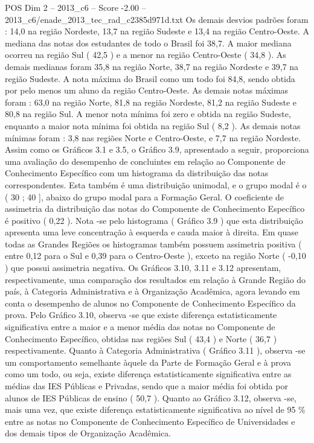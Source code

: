 \begin{textsample}{POS Dim 2 – 2013\_c6 – Score -2.00 – 2013\_c6/enade\_2013\_tec\_rad\_c2385d971d.txt}
Os demais desvios padrões foram : 14,0 na região Nordeste, 13,7 na região Sudeste e 13,4 na região Centro-Oeste.
A mediana das notas dos estudantes de todo o Brasil foi 38,7.
A maior mediana ocorreu na região Sul ( 42,5 ) e a menor na região Centro-Oeste ( 34,8 ).
As demais medianas foram 35,8 na região Norte, 38,7 na região Nordeste e 39,7 na região Sudeste.
A nota máxima do Brasil como um todo foi 84,8, sendo obtida por pelo menos um aluno da região Centro-Oeste.
As demais notas máximas foram : 63,0 na região Norte, 81,8 na região Nordeste, 81,2 na região Sudeste e 80,8 na região Sul.
A menor nota mínima foi zero e obtida na região Sudeste, enquanto a maior nota mínima foi obtida na região Sul ( 8,2 ).
As demais notas mínimas foram : 3,8 nas regiões Norte e Centro-Oeste, e 7,7 na região Nordeste.
Assim como os Gráficos 3.1 e 3.5, o Gráfico 3.9, apresentado a seguir, proporciona uma avaliação do desempenho de concluintes em relação ao Componente de Conhecimento Específico com um histograma da distribuição das notas correspondentes.
Esta também é uma distribuição unimodal, e o grupo modal é o ( 30 ; 40 ], abaixo do grupo modal para a Formação Geral.
O coeficiente de assimetria da distribuição das notas do Componente de Conhecimento Específico é positivo ( 0,22 ).
Nota -se pelo histograma ( Gráfico 3.9 ) que esta distribuição apresenta uma leve concentração à esquerda e cauda maior à direita.
Em quase todas as Grandes Regiões os histogramas também possuem assimetria positiva ( entre 0,12 para o Sul e 0,39 para o Centro-Oeste ), exceto na região Norte ( -0,10 ) que possui assimetria negativa.
Os Gráficos 3.10, 3.11 e 3.12 apresentam, respectivamente, uma comparação dos resultados em relação à Grande Região do país, à Categoria Administrativa e à Organização Acadêmica, agora levando em conta o desempenho de alunos no Componente de Conhecimento Específico da prova.
Pelo Gráfico 3.10, observa -se que existe diferença estatisticamente significativa entre a maior e a menor média das notas no Componente de Conhecimento Específico, obtidas nas regiões Sul ( 43,4 ) e Norte ( 36,7 ) respectivamente.
Quanto à Categoria Administrativa ( Gráfico 3.11 ), observa -se um comportamento semelhante àquele da Parte de Formação Geral e à prova como um todo, ou seja, existe diferença estatisticamente significativa entre as médias das IES Públicas e Privadas, sendo que a maior média foi obtida por alunos de IES Públicas de ensino ( 50,7 ).
Quanto ao Gráfico 3.12, observa -se, mais uma vez, que existe diferença estatisticamente significativa ao nível de 95 \% entre as notas no Componente de Conhecimento Específico de Universidades e dos demais tipos de Organização Acadêmica.

\end{textsample}
